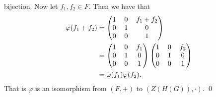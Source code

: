 \begin{enumerate}
      bijection. Now let $f_1, f_2 \in F$. Then we have that
      \begin{align*}
         \varphi(f_1 + f_2) &= \left(\begin{tabular}{@{}ccc@{}}
            1 & 0 & $f_1+f_2$ \\
            0 & 1 & 0 \\
            0 & 0 & 1
         \end{tabular}\right) \\
         &= \left(\begin{tabular}{@{}ccc@{}}
            1 & 0 & $f_1$ \\
            0 & 1 & 0 \\
            0 & 0 & 1
         \end{tabular}\right)\left(\begin{tabular}{@{}ccc@{}}
            1 & 0 & $f_2$ \\
            0 & 1 & 0 \\
            0 & 0 & 1
         \end{tabular}\right) \\
         &= \varphi(f_1)\varphi(f_2).
      \end{align*}
      That is $\varphi$ is an isomorphism from $(F, +)$ to $(Z(H(G)), \cdot)$.
      \qed
\end{enumerate}

